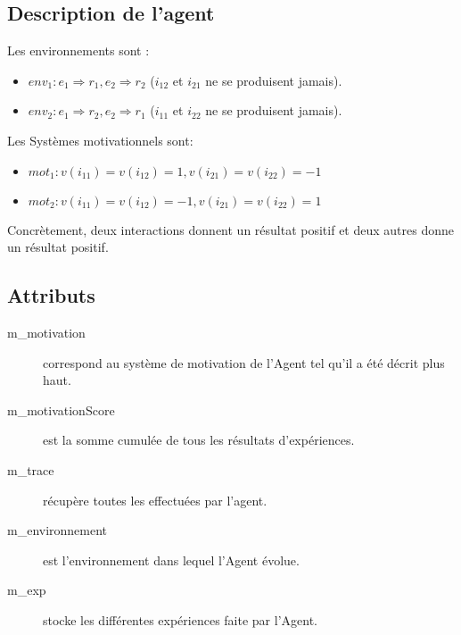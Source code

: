 \documentclass[11pt]{article}
\begin{document}
    \subsection{Description de l'agent}
    Les environnements sont :
      \begin{itemize}
      \item \begin{math} env_1: e_1 \Rightarrow r_1, e_2 \Rightarrow r_2 \end{math} 
      (\begin{math} i_{12}\end{math}  et \begin{math} i_{21}\end{math}  ne se produisent jamais).
      \item \begin{math} env_2:  e_1 \Rightarrow r_2, e_2 \Rightarrow r_1 \end{math} 
      (\begin{math} i_{11} \end{math} et \begin{math} i_{22}\end{math}  ne se produisent jamais).
      \end{itemize}
    Les Systèmes motivationnels sont:
      \begin{itemize}
      \item \begin{math} mot_1:  v(i_{11}) = v(i_{12}) = 1,v(i_{21}) = v(i_{22}) = -1\end{math}
      \item \begin{math} mot_2:  v(i_{11}) = v(i_{12}) = -1,v(i_{21}) = v(i_{22}) = 1 \end{math}
      \end{itemize}
      
      Concrètement, deux interactions donnent un résultat positif et deux autres donne un résultat positif.
    \subsection{Attributs}
      
      \begin{description}
	\item[m\_motivation] correspond au système de motivation de l'Agent tel qu'il a été décrit plus haut.	
	\item[m\_motivationScore] est la somme cumulée de tous les résultats d'expériences.
	\item[m\_trace] récupère toutes les effectuées par l'agent.
	\item[m\_environnement] est l'environnement dans lequel l'Agent évolue.
	\item[m\_exp] stocke les différentes expériences faite par l'Agent.
      \end{description}
\end{document}
